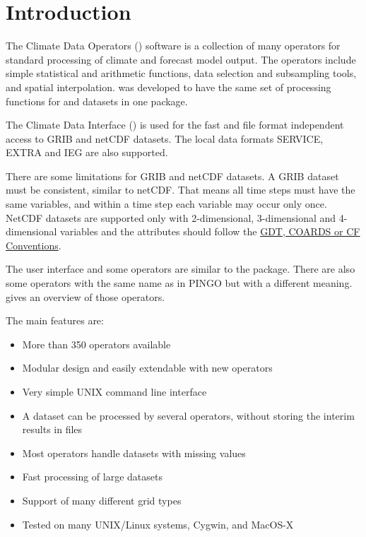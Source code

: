 \chapter{Introduction}

The Climate Data Operators ({\CDO}) software is a collection of many operators
for standard processing of climate and forecast model output.
The operators include simple statistical and arithmetic functions, data selection
and subsampling tools, and spatial interpolation.
{\CDO} was developed to have the same set of processing functions for  and 
datasets in one package.

The Climate Data Interface () is used for the fast and file format
independent access to GRIB and netCDF datasets.
The local data formats SERVICE, EXTRA and IEG are also supported.

There are some limitations for GRIB and netCDF datasets.
A GRIB dataset must be consistent, similar to netCDF.
That means all time steps must have the same variables, and
within a time step each variable may occur only once.
NetCDF datasets are supported only with 2-dimensional, 3-dimensional and 4-dimensional
variables and the attributes should follow the
\href{http://ftp.unidata.ucar.edu/software/netcdf/docs/conventions.html}
     {GDT, COARDS or CF Conventions}.

The user interface and some operators are similar to the  package.
There are also some operators with the same name as in PINGO but with a 
different meaning.  gives an overview of 
those operators.

The main {\CDO} features are:
\begin{itemize}
\item More than 350 operators available
\item Modular design and easily extendable with new operators
\item Very simple UNIX command line interface
\item A dataset can be processed by several operators,
      without storing the interim results in files %
\item Most operators handle datasets with missing values
\item Fast processing of large datasets
\item Support of many different grid types
\item Tested on many UNIX/Linux systems, Cygwin, and MacOS-X
\end{itemize}














